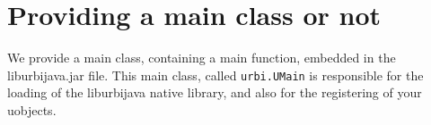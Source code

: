 %
%
%
%
%
%
%
%
%
%
%


\section{Providing a main class or not}

We provide a main class, containing a main function, embedded in the
liburbijava.jar file. This main class, called \lstinline{urbi.UMain} is
responsible for the loading of the liburbijava native library, and also for
the registering of your uobjects.

